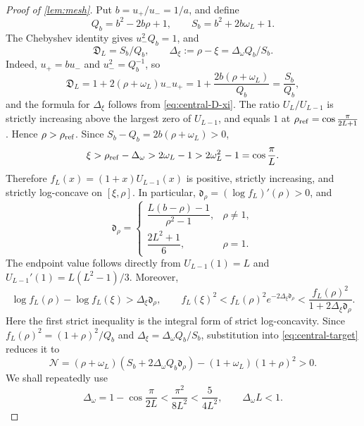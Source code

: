 \documentclass[review,hidelinks,onefignum,onetabnum]{siamart251216}
\begin{document}
\begin{proof}[Proof of \cref{lem:mesh}]
Put \(b=u_+/u_-=1/a\), and define
\[
 Q_b=b^2-2b\rho+1,\qquad S_b=b^2+2b\omega_L+1.
\]
The Chebyshev identity gives \(u_-^2Q_b=1\), and
\begin{equation}\label{eq:central-D-QS}
 \mathfrak D_L=S_b/Q_b,\qquad
 \Delta_\xi:=\rho-\xi=\Delta_\omega Q_b/S_b.
\end{equation}
Indeed, \(u_+=bu_-\) and \(u_-^2=Q_b^{-1}\), so
\[
 \mathfrak D_L=1+2(\rho+\omega_L)u_-u_+
  =1+\frac{2b(\rho+\omega_L)}{Q_b}=\frac{S_b}{Q_b},
\]
and the formula for \(\Delta_\xi\) follows from
\eqref{eq:central-D-xi}.
The ratio \(U_L/U_{L-1}\) is strictly increasing above the largest zero
of \(U_{L-1}\), and equals \(1\) at
\(\rho_{\rm ref}=\cos\frac{\pi}{2L+1}\).  Hence
\(\rho>\rho_{\rm ref}\).  Since
\(S_b-Q_b=2b(\rho+\omega_L)>0\),
\[
 \xi>\rho_{\rm ref}-\Delta_\omega>2\omega_L-1
 >2\omega_L^2-1=\cos\frac{\pi}{L}.
\]
Therefore \(f_L(x)=(1+x)U_{L-1}(x)\) is positive, strictly increasing,
and strictly log-concave on \([\xi,\rho]\).  In particular,
\(\mathfrak d_\rho=(\log f_L)'(\rho)>0\), and
\[
 \mathfrak d_\rho=
 \begin{cases}
  \dfrac{L(b-\rho)-1}{\rho^2-1},&\rho\neq1,\\[6pt]
  \dfrac{2L^2+1}{6},&\rho=1.
 \end{cases}
\]
The endpoint value follows directly from \(U_{L-1}(1)=L\) and
\(U_{L-1}'(1)=L(L^2-1)/3\).  Moreover,
\[
 \log f_L(\rho)-\log f_L(\xi)>\Delta_\xi\mathfrak d_\rho,
 \qquad
 f_L(\xi)^2<f_L(\rho)^2e^{-2\Delta_\xi\mathfrak d_\rho}
 <\frac{f_L(\rho)^2}{1+2\Delta_\xi\mathfrak d_\rho}.
\]
Here the first strict inequality is the integral form of strict
log-concavity.  Since
\(f_L(\rho)^2=(1+\rho)^2/Q_b\) and
\(\Delta_\xi=\Delta_\omega Q_b/S_b\), substitution into
\eqref{eq:central-target} reduces it to
\begin{equation}\label{eq:N-positive-target}
 \mathcal N=(\rho+\omega_L)
 (S_b+2\Delta_\omega Q_b\mathfrak d_\rho)
 -(1+\omega_L)(1+\rho)^2>0.
\end{equation}
We shall repeatedly use
\begin{equation}\label{eq:Delta-omega-basic-bound}
 \Delta_\omega=1-\cos\frac{\pi}{2L}
 <\frac{\pi^2}{8L^2}<\frac5{4L^2},
 \qquad \Delta_\omega L<1.
\end{equation}


\end{proof}
\end{document}
